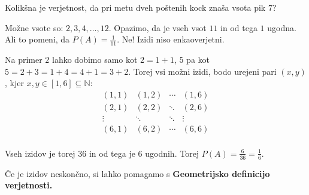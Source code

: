 \documentclass[12pt]{book}
\def\n{\noindent}
\theoremstyle{definition}
\theoremstyle{plain}
\theoremstyle{plain}
\theoremstyle{plain}
\theoremstyle{remark}
\begin{document}
\begin{zgled}
    Kolikšna je verjetnost, da pri metu dveh poštenih kock znaša vsota pik $7$?
    
    Možne vsote so: $2, 3, 4, \dots , 12$. Opazimo, da je vseh vsot $11$ in od tega $1$ ugodna. Ali to pomeni, da $P(A)=\frac{1}{11}$. Ne! Izidi niso enkaoverjetni. 
    
    \n Na primer $2$ lahko dobimo samo kot $2=1+1$, $5$ pa kot $5=2+3=1+4=4+1=3+2$. Torej vsi možni izidi, bodo urejeni pari $(x, y)$, kjer $x, y \in[1,6] \subseteq \mathbb{N}$:
    $$
    \begin{array}{cccc}
        (1,1) & (1,2) & \cdots & (1,6) \\
        (2,1) & (2,2) & \ddots & (2,6)\\
        \vdots & \ddots & \ddots & \vdots \\
        (6,1) & (6,2) & \cdots & (6,6) \\
    \end{array}
    $$

    Vseh izidov je torej $36$ in od tega je $6$ ugodnih. Torej $P(A)= \frac{6}{36}=\frac{1}{6}$.
\end{zgled}

\n Če je izidov neskončno, si lahko pomagamo s \textbf{Geometrijsko definicijo verjetnosti.}
\end{document}
